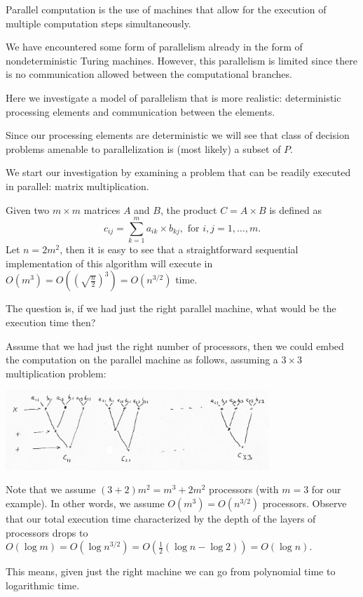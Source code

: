 \documentclass[a4paper,blends,pdf,colorBG,slideColor]{prosper}
\begin{document}

Parallel computation is the use of machines that allow for the execution of
multiple computation steps simultaneously.

We have encountered some form of parallelism already in the form of nondeterministic Turing machines.  However, this parallelism is limited since there is no communication allowed between the computational branches.

Here we investigate a model of parallelism that is more realistic: deterministic processing elements and communication between the elements.

Since our processing elements are deterministic we will see that class of decision problems amenable to parallelization is (most likely) a subset of $P$.
\es

{
We start our investigation by examining a problem that can be readily executed in parallel: matrix multiplication.

Given two $m\times m$ matrices $A$ and $B$, the product $C = A \times B$ is
defined as
\[
c_{ij} = \sum_{k = 1}^m a_{ik} \times b_{kj}, \mbox{ for $i,j = 1,\ldots,m$}.
\]
Let $n = 2m^2$, then it is easy to see that a straightforward sequential implementation of this algorithm will execute in $O(m^3) = O((\sqrt{\frac{n}{2}})^3) = O(n^{3/2})$ time.

The question is, if we had just the right parallel machine, what would be the execution time then?
}
\es

{\small  Assume that we had just the right number of processors, then we could embed
the computation on the parallel machine as follows, assuming a $3\times 3$ multiplication problem:

\begin{center}
\includegraphics[height=30mm]{images/pmult.eps}
\end{center}

Note that we assume $(3 + 2)m^2=m^3+2m^2$ processors (with $m = 3$ for our example).  
In other words, we assume $O(m^3) = O(n^{3/2})$ processors.  Observe that our
total execution time characterized by the depth of the layers of processors
drops to $O(\log m) = O(\log n^{3/2})=O(\frac{1}{2}(\log n - \log 2)) = O(\log n)$.

This means, given just the right machine we can go from polynomial time to logarithmic time.
}
\es
\end{document}
